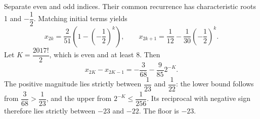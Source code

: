 Separate even and odd indices. Their common recurrence has characteristic roots 1 and $-\dfrac{1}{2}$. Matching initial terms yields
\[x_{2k}=\dfrac{2}{51}\left(1-(-\dfrac{1}{2})^k\right),\qquad x_{2k+1}=\dfrac{1}{12}-\dfrac{1}{30}(-\dfrac{1}{2})^k.\]
Let $ K=\dfrac{2017!}{2}$, which is even and at least 8. Then
\[x_{2K}-x_{2K-1}=-\dfrac{3}{68}-\dfrac{9}{85}2^{-K}.\]
The positive magnitude lies strictly between $\dfrac{1}{23}$ and $\dfrac{1}{22}$: the lower bound follows from $\dfrac{3}{68}>\dfrac{1}{23}$, and the upper from $ 2^{-K}\le\dfrac{1}{256}$. Its reciprocal with negative sign therefore lies strictly between $-23 $ and $-22 $. The floor is $\boxed{-23}$.
